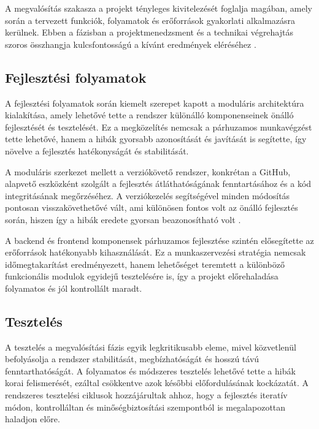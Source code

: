 A megvalósítás szakasza a projekt tényleges kivitelezését foglalja magában, amely során a tervezett funkciók, 
folyamatok és erőforrások gyakorlati alkalmazásra kerülnek. Ebben a fázisban a projektmenedzsment 
és a technikai végrehajtás szoros összhangja kulcsfontosságú a kívánt eredmények eléréséhez \cite{Hajdu2014,Szalay2018,Kaposi2019}.

\subsection{Fejlesztési folyamatok}

A fejlesztési folyamatok során kiemelt szerepet kapott a moduláris architektúra kialakítása, amely lehetővé tette a rendszer különálló komponenseinek önálló fejlesztését és tesztelését.  
Ez a megközelítés nemcsak a párhuzamos munkavégzést tette lehetővé, hanem a hibák gyorsabb azonosítását és javítását is segítette, így növelve a fejlesztés hatékonyságát és stabilitását.  

A moduláris szerkezet mellett a verziókövető rendszer, konkrétan a GitHub, alapvető eszközként szolgált a fejlesztés átláthatóságának 
fenntartásához és a kód integritásának megőrzéséhez.  
A verziókezelés segítségével minden módosítás pontosan visszakövethetővé vált, ami különösen fontos volt az önálló fejlesztés során, 
hiszen így a hibák eredete gyorsan beazonosítható volt \cite{Kovacs2016,Kaposi2019}.  

A backend és frontend komponensek párhuzamos fejlesztése szintén elősegítette az erőforrások hatékonyabb kihasználását.  
Ez a munkaszervezési stratégia nemcsak időmegtakarítást eredményezett, hanem lehetőséget teremtett a különböző funkcionális modulok 
egyidejű tesztelésére is, így a projekt előrehaladása folyamatos és jól kontrollált maradt.

\subsection{Tesztelés}

A tesztelés a megvalósítási fázis egyik legkritikusabb eleme, mivel közvetlenül befolyásolja a rendszer stabilitását, megbízhatóságát és hosszú távú fenntarthatóságát.  
A folyamatos és módszeres tesztelés lehetővé tette a hibák korai felismerését, ezáltal csökkentve azok későbbi előfordulásának kockázatát.  
A rendszeres tesztelési ciklusok hozzájárultak ahhoz, hogy a fejlesztés iteratív módon, kontrolláltan és minőségbiztosítási szempontból is megalapozottan haladjon előre.  

